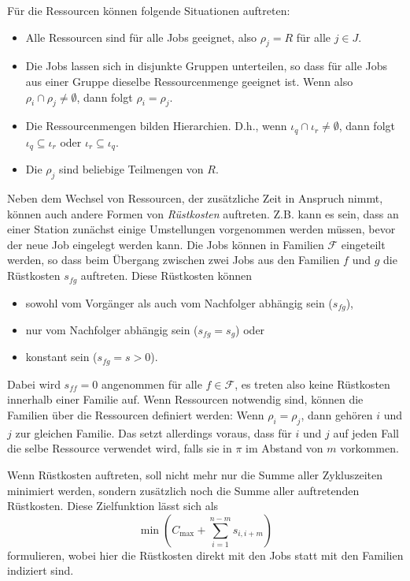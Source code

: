 \documentclass{scrreprt}
\begin{document}
Für die Ressourcen können folgende Situationen auftreten:
\begin{itemize}
    \item Alle Ressourcen sind für alle Jobs geeignet, also $\rho_j=R$ für alle $j\in J$.
    \item Die Jobs lassen sich in disjunkte Gruppen unterteilen, so dass für alle Jobs aus einer Gruppe dieselbe Ressourcenmenge geeignet ist.
        Wenn also $\rho_i \cap \rho_j \neq \emptyset$, dann folgt $\rho_i=\rho_j$.
    \item Die Ressourcenmengen bilden Hierarchien. 
        D.h., wenn $\iota_q \cap \iota_r \neq \emptyset$, dann folgt $\iota_q \subseteq \iota_r$ oder $\iota_r \subseteq \iota_q$.
    \item Die $\rho_j$ sind beliebige Teilmengen von $R$.
\end{itemize}%
Neben dem Wechsel von Ressourcen, der zusätzliche Zeit in Anspruch nimmt, können auch andere Formen von \textit{Rüstkosten}
auftreten. Z.B. kann es sein, dass an einer Station zunächst einige Umstellungen vorgenommen werden müssen, bevor der
neue Job eingelegt werden kann. Die Jobs können in Familien $\mathcal{F}$ eingeteilt werden, so dass beim Übergang
zwischen zwei Jobs aus den Familien $f$ und $g$ die Rüstkosten $s_{fg}$ auftreten.
Diese Rüstkosten können 
\begin{itemize}
    \item sowohl vom Vorgänger als auch vom Nachfolger abhängig sein ($s_{fg}$), 
    \item nur vom Nachfolger abhängig sein ($s_{fg} = s_{g}$) oder
    \item konstant sein ($s_{fg} = s > 0$).
\end{itemize}%
Dabei wird $s_{ff} = 0$ angenommen für alle $f\in\mathcal{F}$, es treten also keine Rüstkosten innerhalb einer Familie auf.
Wenn Ressourcen notwendig sind, können die Familien über die Ressourcen definiert werden:
Wenn $\rho_i=\rho_j$, dann gehören $i$ und $j$ zur gleichen Familie.
Das setzt allerdings voraus, dass für $i$ und $j$ auf jeden Fall die selbe Ressource verwendet wird, falls sie in $\pi$ im Abstand von $m$ vorkommen.

Wenn Rüstkosten auftreten, soll nicht mehr nur die Summe aller Zykluszeiten minimiert werden, sondern zusätzlich noch die Summe aller auftretenden Rüstkosten.
Diese Zielfunktion lässt sich als 
\[ \min\left(C_{\max}+\sum_{i=1}^{n-m}s_{i,i+m}\right) \] 
formulieren, wobei hier die Rüstkosten direkt mit den Jobs statt mit den Familien indiziert sind.
\end{document}
